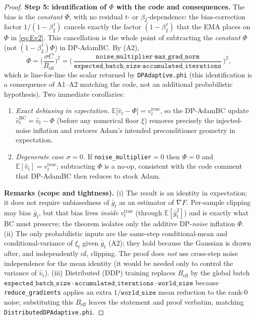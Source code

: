 \begin{proof}
\medskip
\noindent\textbf{Step 5: identification of $\Phi$ with the code and consequences.}
The bias is the \emph{constant} $\Phi$, with no residual $t$- or $\beta_2$-dependence: the
bias-correction factor $1/(1-\beta_2^{\,t})$ cancels exactly the factor $(1-\beta_2^{\,t})$ that
the EMA places on $\Phi$ in \eqref{eq:Ev2}. This cancellation is the whole point of subtracting
the \emph{constant} $\Phi$ (not $(1-\beta_2^{\,t})\Phi$) in DP-AdamBC. By (A2),
\[
  \Phi=\Big(\frac{\sigma C}{B_{\mathrm{eff}}}\Big)^2
  =\Big(\frac{\texttt{noise\_multiplier}\cdot\texttt{max\_grad\_norm}}{\texttt{expected\_batch\_size}\cdot\texttt{accumulated\_iterations}}\Big)^2,
\]
which is line-for-line the scalar returned by \texttt{DPAdaptive.phi} (this identification is a
consequence of A1--A2 matching the code, not an additional probabilistic hypothesis). Two
immediate corollaries:
\begin{enumerate}
  \item \emph{Exact debiasing in expectation.} $\mathbb E\big[\hat v_t-\Phi\big]=v_t^{\mathrm{true}}$,
  so the DP-AdamBC update $\hat v_t^{\mathrm{BC}}=\hat v_t-\Phi$ (before any numerical floor
  $\xi$) removes precisely the injected-noise inflation and restores Adam's intended
  preconditioner geometry in expectation.
  \item \emph{Degenerate case $\sigma=0$.} If \texttt{noise\_multiplier}$=0$ then $\Phi=0$ and
  $\mathbb E[\hat v_t]=v_t^{\mathrm{true}}$; subtracting $\Phi$ is a no-op, consistent with the
  code comment that DP-AdamBC then reduces to stock Adam.
\end{enumerate}

\medskip
\noindent\textbf{Remarks (scope and tightness).}
(i) The result is an identity in expectation; it does not require unbiasedness of $\bar g_t$
as an estimator of $\nabla F$. Per-sample clipping may bias $\bar g_t$, but that bias lives
\emph{inside} $v_t^{\mathrm{true}}$ (through $\mathbb E[\bar g_t^2]$) and is exactly what BC
must preserve; the theorem isolates only the additive DP-\emph{noise} inflation $\Phi$.
(ii) The only probabilistic inputs are the same-step conditional-mean and conditional-variance
of $\xi_t$ given $\bar g_t$ (A2); they hold because the Gaussian is drawn after, and
independently of, clipping. The proof does \emph{not} use cross-step noise independence for the
mean identity (it would be needed only to control the variance of $\hat v_t$).
(iii) Distributed (DDP) training replaces $B_{\mathrm{eff}}$ by the global batch
$\texttt{expected\_batch\_size}\cdot\texttt{accumulated\_iterations}\cdot\texttt{world\_size}$
because \texttt{reduce\_gradients} applies an extra $1/\texttt{world\_size}$ mean reduction to
the rank-0 noise; substituting this $B_{\mathrm{eff}}$ leaves the statement and proof verbatim,
matching \texttt{DistributedDPAdaptive.phi}.
\end{proof}